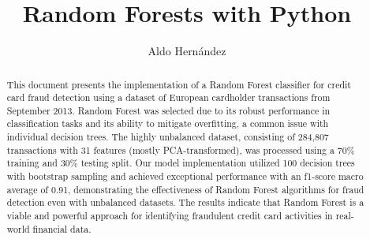 \documentclass[10pt]{article}
\begin{document}
\begin{opening}
  \title{Random Forests with Python}
  \author[Universidad Autónoma de Nuevo León, San Nicolás de los Garza, aldo.hernandezt@uanl.edu.mx]{Aldo Hernández}

  \begin{abstract}
    This document presents the implementation of a Random Forest classifier for credit card fraud detection using a dataset of European cardholder transactions from September 2013. Random Forest was selected due to its robust performance in classification tasks and its ability to mitigate overfitting, a common issue with individual decision trees. The highly unbalanced dataset, consisting of 284,807 transactions with 31 features (mostly PCA-transformed), was processed using a 70\% training and 30\% testing split. Our model implementation utilized 100 decision trees with bootstrap sampling and achieved exceptional performance with an f1-score macro average of 0.91, demonstrating the effectiveness of Random Forest algorithms for fraud detection even with unbalanced datasets. The results indicate that Random Forest is a viable and powerful approach for identifying fraudulent credit card activities in real-world financial data.
  \end{abstract}

\end{opening}
\end{document}
